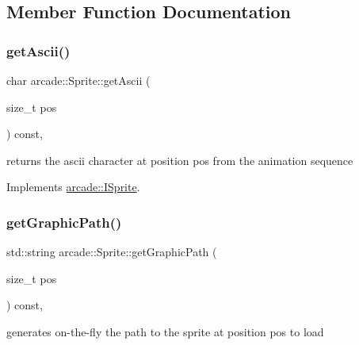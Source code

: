 \subsection{Member Function Documentation}
\mbox{\label{classarcade_1_1_sprite_a168a7f537e0fc6d2d4596cab449fde2c}} 
\subsubsection{\texorpdfstring{get\+Ascii()}{getAscii()}}
{\footnotesize\ttfamily char arcade\+::\+Sprite\+::get\+Ascii (\begin{DoxyParamCaption}\item[{size\+\_\+t}]{pos }\end{DoxyParamCaption}) const\hspace{0.3cm}{\ttfamily [override]}, {\ttfamily [virtual]}}



returns the ascii character at position pos from the animation sequence 



Implements \hyperlink{classarcade_1_1_i_sprite_aa3ab1b0c35f865d38e82b6fb0abce20a}{arcade\+::\+I\+Sprite}.

\mbox{\label{classarcade_1_1_sprite_ad8f344724f99ad369c8c552274fface7}} 
\subsubsection{\texorpdfstring{get\+Graphic\+Path()}{getGraphicPath()}}
{\footnotesize\ttfamily std\+::string arcade\+::\+Sprite\+::get\+Graphic\+Path (\begin{DoxyParamCaption}\item[{size\+\_\+t}]{pos }\end{DoxyParamCaption}) const\hspace{0.3cm}{\ttfamily [override]}, {\ttfamily [virtual]}}



generates on-\/the-\/fly the path to the sprite at position pos to load 



